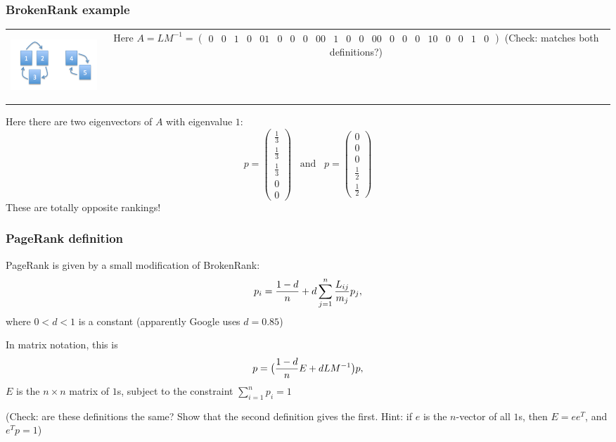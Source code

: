 \documentclass[mathserif]{beamer}
\def\red{\color[rgb]{0.8,0,0}}
\begin{document}
\begin{frame}
\frametitle{BrokenRank example}
\smallskip
\begin{tabular}{cc}
\hspace{-15pt}
\parbox{0.33\textwidth}{
\includegraphics[height=1in]{disconnected-big.png}} &
\hspace{15pt}
\parbox{0.66\textwidth}{
Here $A = LM^{-1} = \left(\begin{array}{ccccc}
0 & 0 & 1 & 0 & 0 \\
1 & 0 & 0 & 0 & 0 \\
0 & 1 & 0 & 0 & 0 \\
0 & 0 & 0 & 0 & 1 \\
0 & 0 & 0 & 1 & 0 \\
\end{array}\right)$
\smallskip\smallskip \\
(Check: matches both definitions?)
}
\end{tabular}

\bigskip
\bigskip
Here there are two eigenvectors of $A$ with 
eigenvalue $1$:
$$p = \left(\begin{array}{c} 
\frac{1}{3} \\ \frac{1}{3} \\ \frac{1}{3} \\ 0 \\ 0
\end{array}\right) \;\;\;\text{and}\;\;\;
p = \left(\begin{array}{c} 
0 \\ 0 \\ 0 \\ \frac{1}{2} \\ \frac{1}{2}
\end{array}\right)$$
These are totally {\red opposite rankings!}
\end{frame}

\begin{frame}
\frametitle{PageRank definition}
{\red PageRank} is given by a small modification of
BrokenRank:
\vspace{-3pt}
$$p_i = \frac{1-d}{n} + d \sum_{j=1}^n
\frac{L_{ij}}{m_j} p_j,
\vspace{-3pt}$$
where $0<d<1$ is a constant 
(apparently Google uses $d=0.85$)

\bigskip
In {\red matrix notation}, this is
\vspace{-3pt}
$$p = \big(\frac{1-d}{n}E + d LM^{-1}\big)p,
\vspace{-3pt}$$
 $E$ is the $n\times n$ matrix of $1$s,
subject to the constraint $\sum_{i=1}^n p_i=1$

\bigskip
(Check: are these definitions the same? Show that 
the second definition gives the first. Hint: if $e$ 
is the $n$-vector of all $1$s, then $E=e e^T$, 
and $e^T p = 1$)
\end{frame}
\end{document}
